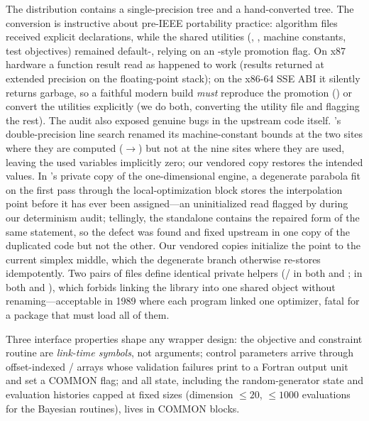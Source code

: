 The distribution contains a single-precision tree and a hand-converted
 tree. The conversion is instructive about pre-IEEE
portability practice: algorithm files received explicit
 declarations, while the shared utilities
(, , machine constants, test objectives) remained
default-, relying on an -style promotion flag.
On x87 hardware a  function result read as 
happened to work (results returned at extended precision on the
floating-point stack); on the x86-64 SSE ABI it silently returns garbage,
so a faithful modern build \emph{must} reproduce the promotion
() or convert the utilities
explicitly (we do both, converting the utility file and flagging the
rest). The audit also exposed genuine bugs in the upstream code itself.
's double-precision line search renamed its
machine-constant bounds at the two sites where they are computed
(${}\to{}$) but not at the nine sites where they
are used, leaving the used variables implicitly zero; our vendored copy
restores the intended values. In 's private copy of the
one-dimensional engine, a degenerate parabola fit on the first pass
through the local-optimization block stores the interpolation point
before it has ever been assigned---an uninitialized read flagged by
 during our determinism audit; tellingly,
the standalone  contains the repaired form of the same
statement, so the defect was found and fixed upstream in one copy of
the duplicated code but not the other. Our vendored copies initialize
the point to the current simplex middle, which the degenerate branch
otherwise re-stores idempotently. Two pairs of files define identical
private helpers (/ in both  and
;  in both  and
), which forbids linking the library into one shared
object without renaming---acceptable in 1989 where each program linked
one optimizer, fatal for a package that must load all of them.

Three interface properties shape any wrapper design: the objective
 and constraint routine  are
\emph{link-time symbols}, not arguments; control parameters arrive
through offset-indexed / arrays whose
validation failures print to a Fortran output unit and set a COMMON flag;
and all state, including the random-generator state and evaluation
histories capped at fixed sizes (dimension $\le 20$, $\le 1000$
evaluations for the Bayesian routines), lives in COMMON blocks.

